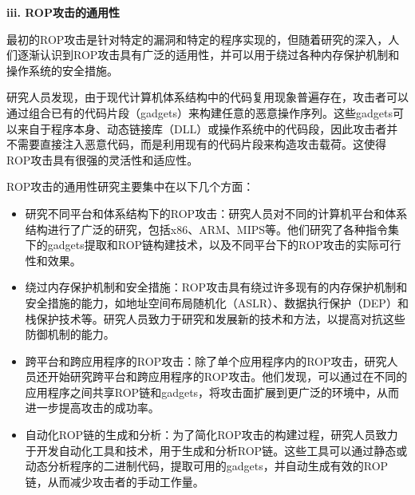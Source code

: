 \documentclass[UTF8,12pt,a4paper]{ctexart}
\numberwithin{figure}{section}
\begin{document}
\textbf{iii. ROP攻击的通用性}
\par 最初的ROP攻击是针对特定的漏洞和特定的程序实现的，但随着研究的深入，人们逐渐认识到ROP攻击具有广泛的适用性，并可以用于绕过各种内存保护机制和操作系统的安全措施。
\par 研究人员发现，由于现代计算机体系结构中的代码复用现象普遍存在，攻击者可以通过组合已有的代码片段（gadgets）来构建任意的恶意操作序列。这些gadgets可以来自于程序本身、动态链接库（DLL）或操作系统中的代码段，因此攻击者并不需要直接注入恶意代码，而是利用现有的代码片段来构造攻击载荷。这使得ROP攻击具有很强的灵活性和适应性。
\par ROP攻击的通用性研究主要集中在以下几个方面：
\begin{itemize}
    \item 研究不同平台和体系结构下的ROP攻击：研究人员对不同的计算机平台和体系结构进行了广泛的研究，包括x86、ARM、MIPS等。他们研究了各种指令集下的gadgets提取和ROP链构建技术，以及不同平台下的ROP攻击的实际可行性和效果。
    \item 绕过内存保护机制和安全措施：ROP攻击具有绕过许多现有的内存保护机制和安全措施的能力，如地址空间布局随机化（ASLR）、数据执行保护（DEP）和栈保护技术等。研究人员致力于研究和发展新的技术和方法，以提高对抗这些防御机制的能力。
    \item 跨平台和跨应用程序的ROP攻击：除了单个应用程序内的ROP攻击，研究人员还开始研究跨平台和跨应用程序的ROP攻击。他们发现，可以通过在不同的应用程序之间共享ROP链和gadgets，将攻击面扩展到更广泛的环境中，从而进一步提高攻击的成功率。
    \item 自动化ROP链的生成和分析：为了简化ROP攻击的构建过程，研究人员致力于开发自动化工具和技术，用于生成和分析ROP链。这些工具可以通过静态或动态分析程序的二进制代码，提取可用的gadgets，并自动生成有效的ROP链，从而减少攻击者的手动工作量。
\end{itemize}
\end{document}
